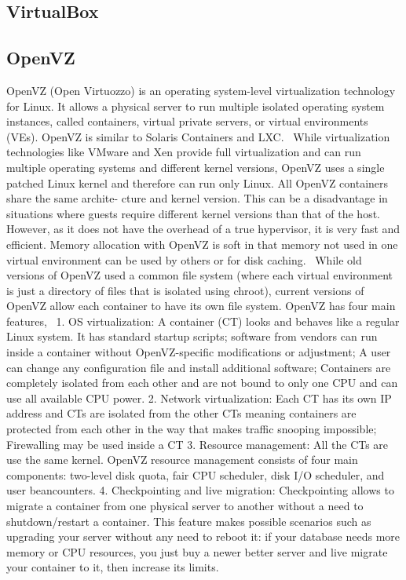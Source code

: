{\subsection{VirtualBox}

\pv 

\subsection{OpenVZ \cv}

OpenVZ (Open Virtuozzo) is an operating system-level virtualization
technology for Linux. It allows a physical server to run multiple
isolated operating system instances, called containers, virtual
private servers, or virtual environments (VEs). OpenVZ is similar to
Solaris Containers and LXC.~\cite{www-openvz-3} While virtualization
technologies like VMware and Xen provide full virtualization and can
run multiple operating systems and different kernel versions, OpenVZ
uses a single patched Linux kernel and therefore can run only
Linux. All OpenVZ containers share the same archite- cture and kernel
version. This can be a disadvantage in situations where guests require
different kernel versions than that of the host. However, as it does
not have the overhead of a true hypervisor, it is very fast and
efficient. Memory allocation with OpenVZ is soft in that memory not
used in one virtual environment can be used by others or for disk
caching.~\cite{www-openvz-2} While old versions of OpenVZ used a
common file system (where each virtual environment is just a directory
of files that is isolated using chroot), current versions of OpenVZ
allow each container to have its own file system.  OpenVZ has four
main features,~\cite{www-openvz-1} 1. OS virtualization: A container
(CT) looks and behaves like a regular Linux system. It has standard
startup scripts; software from vendors can run inside a container
without OpenVZ-specific modifications or adjustment; A user can change
any configuration file and install additional software; Containers are
completely isolated from each other and are not bound to only one CPU
and can use all available CPU power.  2. Network virtualization: Each
CT has its own IP address and CTs are isolated from the other CTs
meaning containers are protected from each other in the way that makes
traffic snooping impossible; Firewalling may be used inside a CT
3. Resource management: All the CTs are use the same kernel. OpenVZ
resource management consists of four main components: two-level disk
quota, fair CPU scheduler, disk I/O scheduler, and user beancounters.
4. Checkpointing and live migration: Checkpointing allows to migrate a
container from one physical server to another without a need to
shutdown/restart a container. This feature makes possible scenarios
such as upgrading your server without any need to reboot it: if your
database needs more memory or CPU resources, you just buy a newer
better server and live migrate your container to it, then increase its
limits.


}
